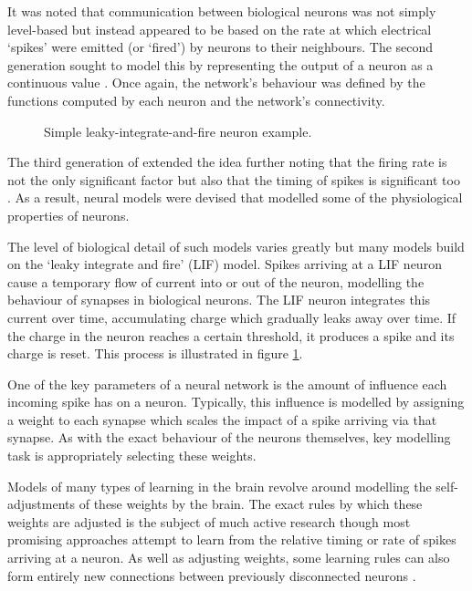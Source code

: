 			It was noted that communication between biological neurons was not simply
			level-based but instead appeared to be based on the rate at which
			electrical `spikes' were emitted (or `fired') by neurons to their
			neighbours. The second generation sought to model this by representing the
			output of a neuron as a continuous value \cite{maass97}. Once again, the
			network's behaviour was defined by the functions computed by each neuron
			and the network's connectivity.
			
			\begin{figure}
				\center
				
				\caption{Simple leaky-integrate-and-fire neuron example.}
				\label{fig:snn-example}
			\end{figure}
			
			The third generation of extended the idea further noting that the firing
			rate is not the only significant factor but also that the timing of spikes
			is significant too \cite{maass01}. As a result, neural models were devised
			that modelled some of the physiological properties of neurons.
			
			The level of biological detail of such models varies greatly but many
			models build on the `leaky integrate and fire' (LIF) model.  Spikes
			arriving at a LIF neuron cause a temporary flow of current into or out of
			the neuron, modelling the behaviour of synapses in biological neurons. The
			LIF neuron integrates this current over time, accumulating charge which
			gradually leaks away over time. If the charge in the neuron reaches a
			certain threshold, it produces a spike and its charge is reset. This
			process is illustrated in figure \ref{fig:snn-example}.
			
			One of the key parameters of a neural network is the amount of influence
			each incoming spike has on a neuron. Typically, this influence is modelled
			by assigning a weight to each synapse which scales the impact of a spike
			arriving via that synapse. As with the exact behaviour of the neurons
			themselves, key modelling task is appropriately selecting these weights.
			
			Models of many types of learning in the brain revolve around modelling the
			self-adjustments of these weights by the brain. The exact rules by which
			these weights are adjusted is the subject of much active research though
			most promising approaches attempt to learn from the relative timing
			\cite{pfister06} or rate \cite{bienenstock82} of spikes arriving at a
			neuron. As well as adjusting weights, some learning rules can also form
			entirely new connections between previously disconnected neurons
			\cite{bamford10}.
		
